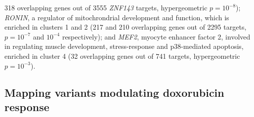 \documentclass{article}
\begin{document}
318 overlapping genes out of 3555 \emph{ZNF143} targets, hypergeometric $p=10^{-8}$); \emph{RONIN}, a regulator of mitochrondrial development and function\cite{Poche2016}, which is enriched in clusters 1 and 2 (217 and 210 overlapping genes out of 2295 targets, $p=10^{-7}$ and $10^{-4}$ respectively); and \emph{MEF2}, myocyte enhancer factor 2, involved in regulating muscle development, stress-response and p38-mediated apoptosis\cite{Zarubin2005}, enriched in cluster 4 (32 overlapping genes out of 741 targets, hypergeometric $p=10^{-3}$). 

\subsection*{Mapping variants modulating doxorubicin response}

\begin{figure}
\begin{center}

\end{center}
\end{figure}
\end{document}
